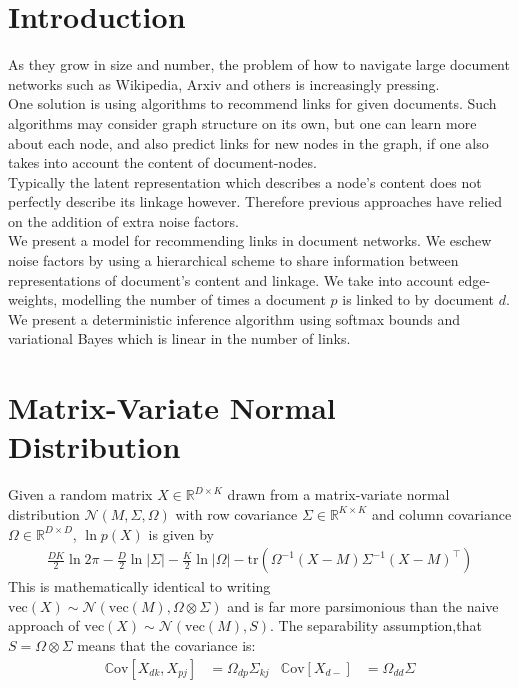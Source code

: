 \documentclass{sciposter}
\newcommand \vecf[1] {
    \text{vec}\left(#1\right)
}
\newcommand \cov[1] {
    \mathbb{C}\text{ov}[ #1 ]
}
\newcommand \halve[1] {
	\frac{#1}{2}
}
\newcommand \tr { \text{tr} }
\newcommand \T { ^\top }
\newcommand \nor[2]   { \mathcal{N} \left( {#1}, {#2} \right) }
\newcommand \mnor[3]  { \mathcal{N} \left(#1, #2, #3\right) }
\newcommand \Tr[1]   { \tr \left(  {#1}  \right) }
\newcommand \MReal[2] { { \mathbb{R}^{#1 \times #2} } }
\newcommand \inv[1] { {#1}^{-1} }
\begin{document}
\begin{multicols}{3}

\section{Introduction}
As they grow in size and number, the problem of how to navigate large document networks such as Wikipedia, Arxiv and others is increasingly pressing. \\

One solution is using algorithms to recommend links for given documents. Such algorithms may consider graph structure on its own\cite{Gopalan2013b}, but one can learn more about each node, and also predict links for new nodes in the graph, if one also takes into account the content of document-nodes. \\

Typically the latent representation which describes a node's content does not perfectly describe its linkage however. Therefore previous approaches have relied on the addition of extra noise factors\cite{Chang2009a}\cite{Neiswanger2014}. \\

We present a model for recommending links in document networks. We eschew noise factors by using a hierarchical scheme to share information between representations of document's content and linkage. We take into account edge-weights, modelling the number of times a document $p$ is linked to by document $d$. We present a deterministic inference algorithm using softmax bounds and variational Bayes which is linear in the number of links.


\section{Matrix-Variate Normal Distribution}
Given a random matrix $X \in \MReal{D}{K}$ drawn from a matrix-variate normal distribution $\mnor{M}{\Sigma}{\Omega}$ with row covariance $\Sigma \in \MReal{K}{K}$ and column covariance $\Omega \in \MReal{D}{D}$, $\ln p(X)$ is given by
\begin{align*}
\halve{DK}\ln 2\pi - \halve{D}\ln|\Sigma| - \halve{K} \ln|\Omega| -\Tr{\inv{\Omega}(X - M)\inv{\Sigma}(X - M)\T}
\end{align*}
This is mathematically identical to writing\\ $\vecf{X} \sim \nor{\vecf{M}}{\Omega \otimes \Sigma}$ and is far more parsimonious than the naive approach of $\vecf{X} \sim \nor{\vecf{M}}{S}$. The separability assumption,that $S = \Omega \otimes \Sigma$ means that the covariance is:
\begin{align*}
\cov{X_{dk}, X_{pj}} & = \Omega_{dp} \Sigma_{kj} &
\cov{X_{d-}} & = \Omega_{dd} \Sigma 
\end{align*}



\end{multicols}
\end{document}
